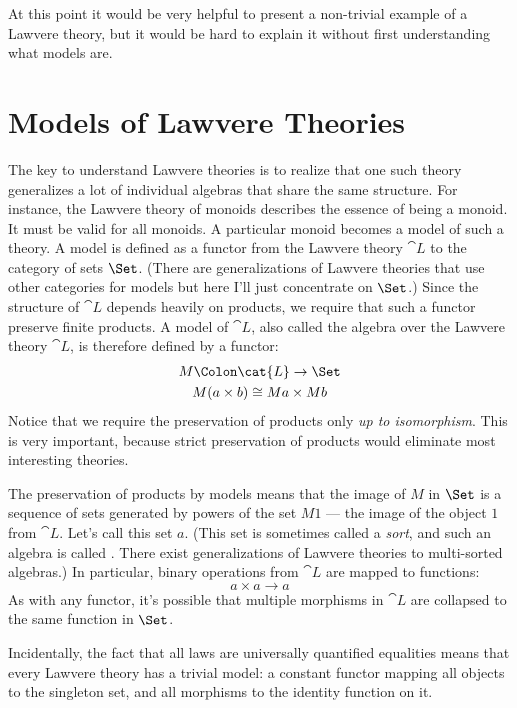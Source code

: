 At this point it would be very helpful to present a non-trivial example
of a Lawvere theory, but it would be hard to explain it without first
understanding what models are.

\section{Models of Lawvere Theories}

The key to understand Lawvere theories is to realize that one such
theory generalizes a lot of individual algebras that share the same
structure. For instance, the Lawvere theory of monoids describes the
essence of being a monoid. It must be valid for all monoids. A
particular monoid becomes a model of such a theory. A model is defined
as a functor from the Lawvere theory $\cat{L}$ to the category of sets
$\Set$. (There are generalizations of Lawvere theories that use
other categories for models but here I'll just concentrate on
$\Set$.) Since the structure of $\cat{L}$ depends heavily on
products, we require that such a functor preserve finite products. A
model of $\cat{L}$, also called the algebra over the Lawvere theory
$\cat{L}$, is therefore defined by a functor:
\begin{gather*}
  M \Colon \cat{L} \to \Set \\
  M (a \times b) \cong M a \times M b
\end{gather*}
Notice that we require the preservation of products only \emph{up to
  isomorphism}. This is very important, because strict preservation of
products would eliminate most interesting theories.

The preservation of products by models means that the image of
$M$ in $\Set$ is a sequence of sets generated by powers of
the set $M 1$ --- the image of the object $1$ from
$\cat{L}$. Let's call this set $a$. (This set is sometimes
called a \emph{sort}, and such an algebra is called . There
exist generalizations of Lawvere theories to multi-sorted algebras.) In
particular, binary operations from $\cat{L}$ are mapped to functions:
\[a \times a \to a\]
As with any functor, it's possible that multiple morphisms in $\cat{L}$
are collapsed to the same function in $\Set$.

Incidentally, the fact that all laws are universally quantified
equalities means that every Lawvere theory has a trivial model: a
constant functor mapping all objects to the singleton set, and all morphisms
to the identity function on it.

